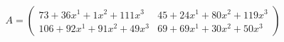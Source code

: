\documentclass[preview]{standalone}
\begin{document}
\begin{align*}
A = \begin{pmatrix}73 + 36x^{1} + 1x^{2} + 111x^{3} & 45 + 24x^{1} + 80x^{2} + 119x^{3} \\ 106 + 92x^{1} + 91x^{2} + 49x^{3} & 69 + 69x^{1} + 30x^{2} + 50x^{3}\end{pmatrix}
\end{align*}
\end{document}
